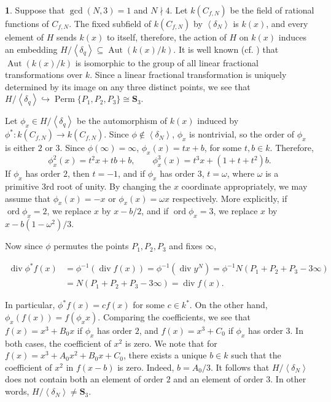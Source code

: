 \documentclass{amsart}[11pt]
\theoremstyle{definition}
\newtheorem{sect}[thm]{}
\numberwithin{equation}{section}
\theoremstyle{notitle}
\begin{document}
\begin{sect}
  Suppose that $\gcd(N,3)=1$ and $N\nmid 4$. Let $k(C_{f,N})$ be the
  field of rational functions of $C_{f,N}$.  The fixed subfield of
  $k(C_{f,N})$ by ${\left\langle {\delta_N} \right\rangle}$ is $k(x)$, and every element of
  $H$ sends $k(x)$ to itself, therefore, the action of $H$ on $k(x)$
  induces an embedding $H/{\left\langle {\delta_q} \right\rangle}\subseteq \operatorname{Aut}(k(x)/k)$.  It
  is well known (cf. \cite[Corollary 6.65]{MR2674831}) that
  $\operatorname{Aut}(k(x)/k)$ is isomorphic to the group of all linear fractional 
  transformations over $k$. Since a linear fractional transformation
  is uniquely determined by its image on any three distinct points, we
  see that $H/{\left\langle {\delta_q} \right\rangle}\hookrightarrow \operatorname{Perm}{\{P_1, P_2, P_3\}}\cong
  \mathbf{S}_3$.

  Let $\phi_x\in H/{\left\langle {\delta_q} \right\rangle}$ be the automorphism of $k(x)$
  induced by $\phi^*: k(C_{f,N})\to k(C_{f,N})$. Since $\phi\not\in
  {\left\langle {\delta_N} \right\rangle}$, $\phi_x$ is nontrivial, so the order of $\phi_x$
  is either $2$ or $3$.  Since $\phi(\infty) = \infty$,
  $\phi_x(x)=tx+b$, for some $t, b\in k$. Therefore, 
\[ \phi_x^2(x)=t^2x+tb+b, \qquad \phi_x^3(x)= t^3x+(1+t+t^2)b.\]
If $\phi_x$ has order $2$, then $t=-1$, and if $\phi_x$ has order $3$,
$t = \omega$, where $\omega$ is a primitive 3rd root of unity. By
changing the $x$ coordinate appropriately, we may assume that
$\phi_x(x)=-x$ or $\phi_x(x)=\omega x$ respectively. More explicitly,
if $\operatorname{ord}\phi_x=2$, we replace $x$ by $x-b/2$, and if $\operatorname{ord}\phi_x=3$,
we replace $x$ by $x-b(1-\omega^2)/3$.

Now since $\phi$ permutes the points $P_1, P_2, P_3$ and fixes
$\infty$,

\[
\begin{split}
\operatorname{div} \phi^* f(x) &= \phi^{-1} (\operatorname{div} f(x))= \phi^{-1} (\operatorname{div} y^N)= \phi^{-1} N( P_1+P_2+P_3 -3\infty)\\&=   N( P_1+P_2+P_3 -3\infty )= \operatorname{div} f(x).   
\end{split}
 \]

 In particular, $\phi^* f(x)= c f(x)$ for some $c\in k^*$. On the
 other hand, $\phi_x(f(x))= f(\phi_x x)$. Comparing the coefficients,
 we see that $f(x)=x^3+B_0x$ if $\phi_x$ has order $2$, and $f(x)=
 x^3+C_0$ if $\phi_x$ has order $3$. In both cases, the coefficient of
 $x^2$ is zero.  We note that for $f(x)=x^3+A_0x^2+B_0x+C_0$, there
 exists a unique $b\in k$ such that the coefficient of $x^2$ in
 $f(x-b)$ is zero. Indeed, $b=A_0/3$. It follows that
 $H/{\left\langle {\delta_N} \right\rangle}$ does not contain both an element of order $2$
 and an element of order $3$. In other words, $H/{\left\langle {\delta_N} \right\rangle}\neq
 \mathbf{S}_3$.


\end{sect}
\end{document}
